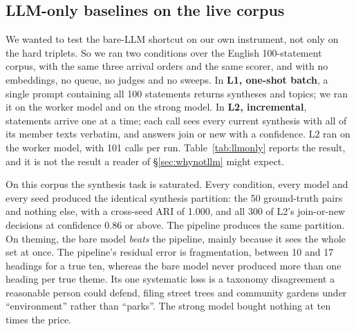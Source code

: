 \subsection{LLM-only baselines on the live corpus}
\label{sec:llmonly}
We wanted to test the bare-LLM shortcut on our own instrument, not only on the hard triplets. So we ran two conditions over the English 100-statement corpus, with the same three arrival orders and the same scorer, and with no embeddings, no queue, no judges and no sweeps. In \textbf{L1, one-shot batch}, a single prompt containing all 100 statements returns syntheses and topics; we ran it on the worker model and on the strong model. In \textbf{L2, incremental}, statements arrive one at a time; each call sees every current synthesis with all of its member texts verbatim, and answers join or new with a confidence. L2 ran on the worker model, with 101 calls per run. Table~\ref{tab:llmonly} reports the result, and it is not the result a reader of \S\ref{sec:whynotllm} might expect.

\begin{table}[t]
\centering\scriptsize
\caption{Bare-LLM baselines against the production pipeline on the 100-statement English corpus, with identical arrival orders and scorer. Values are the mean and range over seeds 42, 7 and 1234. The pipeline row comes from the certified runs of \S\ref{sec:live}; its wall-clock time is dominated by the harness's settle waits and is not comparable.}
\label{tab:llmonly}
\end{table}

On this corpus the synthesis task is saturated. Every condition, every model and every seed produced the identical synthesis partition: the 50 ground-truth pairs and nothing else, with a cross-seed ARI of 1.000, and all 300 of L2's join-or-new decisions at confidence 0.86 or above. The pipeline produces the same partition. On theming, the bare model \emph{beats} the pipeline, mainly because it sees the whole set at once. The pipeline's residual error is fragmentation, between 10 and 17 headings for a true ten, whereas the bare model never produced more than one heading per true theme. Its one systematic loss is a taxonomy disagreement a reasonable person could defend, filing street trees and community gardens under ``environment'' rather than ``parks''. The strong model bought nothing at ten times the price.

